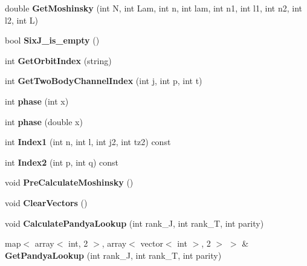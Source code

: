 \begin{DoxyCompactItemize}
\item 
double {\bfseries Get\+Moshinsky} (int N, int Lam, int n, int lam, int n1, int l1, int n2, int l2, int L)\hypertarget{classModelSpace_a85f0b95b2cd46504702ea80489455beb}{}\label{classModelSpace_a85f0b95b2cd46504702ea80489455beb}

\item 
bool {\bfseries Six\+J\+\_\+is\+\_\+empty} ()\hypertarget{classModelSpace_aae435e6ade2addd7787e7948a3ae542c}{}\label{classModelSpace_aae435e6ade2addd7787e7948a3ae542c}

\item 
int {\bfseries Get\+Orbit\+Index} (string)\hypertarget{classModelSpace_a228a41c1c2694793edbc7cd11267a0f2}{}\label{classModelSpace_a228a41c1c2694793edbc7cd11267a0f2}

\item 
int {\bfseries Get\+Two\+Body\+Channel\+Index} (int j, int p, int t)\hypertarget{classModelSpace_ae73e211248e6f2bd4cc1bb0f030144ce}{}\label{classModelSpace_ae73e211248e6f2bd4cc1bb0f030144ce}

\item 
int {\bfseries phase} (int x)\hypertarget{classModelSpace_a6b4d1686088e3fef492df10bbd806fe2}{}\label{classModelSpace_a6b4d1686088e3fef492df10bbd806fe2}

\item 
int {\bfseries phase} (double x)\hypertarget{classModelSpace_a07d1c8f00131cc6c192d440e6be329f3}{}\label{classModelSpace_a07d1c8f00131cc6c192d440e6be329f3}

\item 
int {\bfseries Index1} (int n, int l, int j2, int tz2) const \hypertarget{classModelSpace_ab9e4a36b032abc3fcd81da8b2a8707d2}{}\label{classModelSpace_ab9e4a36b032abc3fcd81da8b2a8707d2}

\item 
int {\bfseries Index2} (int p, int q) const \hypertarget{classModelSpace_acb31fdcb54a8fe3168378969176f0157}{}\label{classModelSpace_acb31fdcb54a8fe3168378969176f0157}

\item 
void {\bfseries Pre\+Calculate\+Moshinsky} ()\hypertarget{classModelSpace_abc436144ee034558058227cac872ecb9}{}\label{classModelSpace_abc436144ee034558058227cac872ecb9}

\item 
void {\bfseries Clear\+Vectors} ()\hypertarget{classModelSpace_a25aad2961ae99cdd528c4d71bb689d95}{}\label{classModelSpace_a25aad2961ae99cdd528c4d71bb689d95}

\item 
void {\bfseries Calculate\+Pandya\+Lookup} (int rank\+\_\+J, int rank\+\_\+T, int parity)\hypertarget{classModelSpace_abe6a15d78c5a16e707a02e5d2341f1f0}{}\label{classModelSpace_abe6a15d78c5a16e707a02e5d2341f1f0}

\item 
map$<$ array$<$ int, 2 $>$, array$<$ vector$<$ int $>$, 2 $>$ $>$ \& {\bfseries Get\+Pandya\+Lookup} (int rank\+\_\+J, int rank\+\_\+T, int parity)\hypertarget{classModelSpace_a2e75ef41cd7f02485a5ab5c340c27bef}{}\label{classModelSpace_a2e75ef41cd7f02485a5ab5c340c27bef}

\end{DoxyCompactItemize}
